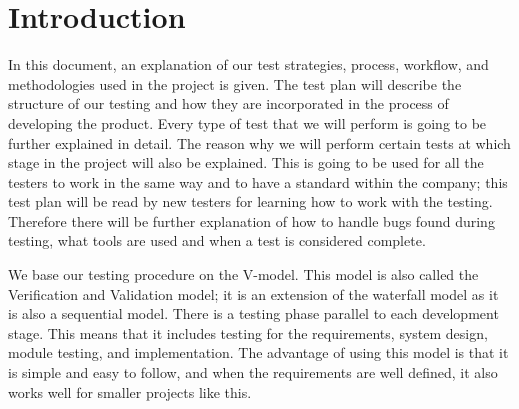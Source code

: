 \section{Introduction}
In this document, an explanation of our test strategies, process, workflow, and methodologies used in the project is given. The test plan will describe the structure of our testing and how they are incorporated in the process of developing the product. Every type of test that we will perform is going to be further explained in detail. The reason why we will perform certain tests at which stage in the project will also be explained. This is going to be used for all the testers to work in the same way and to have a standard within the company; this test plan will be read by new testers for learning how to work with the testing. Therefore there will be further explanation of how to handle bugs found during testing, what tools are used and when a test is considered complete.
\newline 

\noindent We base our testing procedure on the V-model. This model is also called the Verification and Validation model; it is an extension of the waterfall model as it is also a sequential model. There is a testing phase parallel to each development stage. This means that it includes testing for the requirements, system design, module testing, and implementation. The advantage of using this model is that it is simple and easy to follow, and when the requirements are well defined, it also works well for smaller projects like this.
\newline


